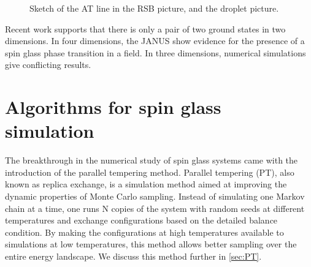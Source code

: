\begin{figure}
  \centering
  \hspace{0.5cm}
  \caption{Sketch of the AT line in the RSB picture, and the droplet picture.}
  \label{fig:at_line}
\end{figure}

Recent work supports that there is only a pair of two ground states in two dimensions.
In four dimensions, the JANUS show evidence for the presence of a spin glass
phase transition in a field. In three dimensions, numerical simulations give 
conflicting results.


\section{Algorithms for spin glass simulation}
The breakthrough in the numerical study of spin glass systems came with the 
introduction of the parallel tempering method. Parallel tempering (PT), also known
as replica exchange, is a simulation method aimed at improving the dynamic 
properties of Monte Carlo sampling. Instead of simulating one Markov chain at 
a time, one runs N copies of the system with random seeds at different 
temperatures and exchange configurations based on the detailed balance condition.
By making the configurations at high temperatures available to simulations at 
low temperatures, this method allows better sampling over the entire energy
landscape. We discuss this method further in \ref{sec:PT}.

